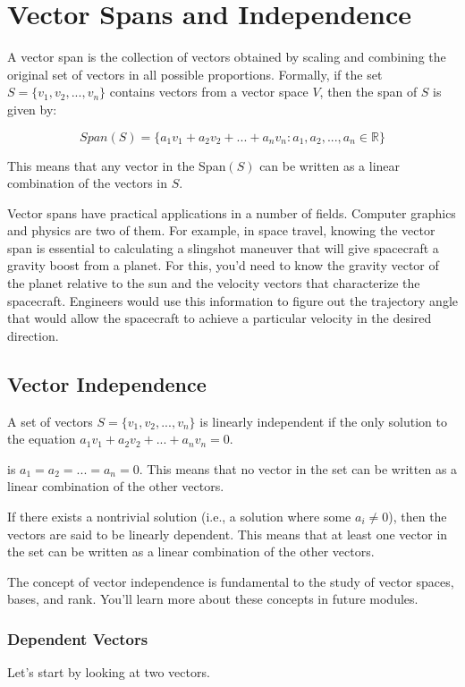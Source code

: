 \chapter{Vector Spans and Independence}
A vector span is the collection of vectors obtained by scaling and combining the original set of vectors in all possible proportions.  Formally, if the set $S = \{v_1, v_2, ..., v_n\}$ contains vectors from a vector space $V$, then the span of $S$ is given by:

\begin{equation}
{Span}(S) = \{a_1v_1 + a_2v_2 + ... + a_nv_n : a_1, a_2, ..., a_n \in \mathbb{R}\}
\end{equation}

This means that any vector in the Span$(S)$ can be written as a linear combination of the vectors in $S$.

Vector spans have practical applications in a number of fields. Computer graphics and physics are two of them. For example, in space travel, knowing the vector span is essential to calculating a slingshot maneuver that will give spacecraft a gravity boost from a planet. For this, you'd need to know the gravity vector of the planet relative to the sun and the velocity vectors that characterize the spacecraft. Engineers would use this information to figure out the trajectory angle that would allow the spacecraft to achieve a particular velocity in the desired direction. 

\section{Vector Independence}
A set of vectors $S = \{v_1, v_2, ..., v_n\}$ is  linearly independent if the only solution to the equation $a_1v_1 + a_2v_2 + ... + a_nv_n = 0$.

is $a_1 = a_2 = ... = a_n = 0$. This means that no vector in the set can be written as a linear combination of the other vectors.

If there exists a nontrivial solution (i.e., a solution where some $a_i \neq 0$), then the vectors are said to be linearly dependent. This means that at least one vector in the set can be written as a linear combination of the other vectors.

The concept of vector independence is fundamental to the study of vector spaces, bases, and rank. You'll learn more about these concepts in future modules. 

\subsection{Dependent Vectors}
Let's start by looking at two vectors. 

